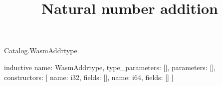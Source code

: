 \begin{lexlean}{Catalog.WasmAddrtype}
\title{Natural number addition}
\begin{semanticmodule}
inductive{
  name: WasmAddrtype,
  type_parameters: [],
  parameters: [],
  constructors: [
    {name: i32, fields: []},
    {name: i64, fields: []}
  ]
}
\end{semanticmodule}
\end{lexlean}
